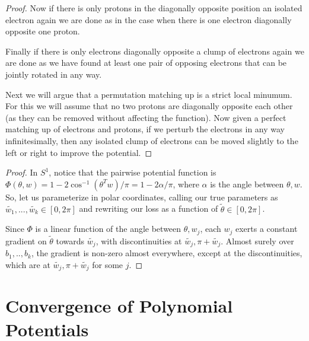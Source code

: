 \documentclass{article}
\begin{document}
\begin{proof}
Now if there is only protons in the diagonally opposite position an isolated electron again we are done as in the case when there is one electron diagonally opposite one proton. 

Finally if there is only electrons diagonally opposite a clump of electrons again we are done as we have found at least one pair of opposing electrons that can be jointly rotated in any way.

Next we will argue that a permutation matching up is a strict local minumum. For this we will assume that no two protons are diagonally opposite each other (as they can be removed without affecting the function). Now given a perfect matching up of electrons and protons, if we perturb the electrons in any way infinitesimally, then any isolated clump of electrons can be moved slightly to  the left or right to improve the potential.
\end{proof}

\signconv*

\begin{proof}
In $S^1$, notice that the pairwise potential function is $\Phi(\theta,w) = 1 - 2\cos^{-1}(\theta^Tw)/\pi = 1 - 2\alpha/\pi$, where $\alpha$ is the angle between $\theta, w$. So, let us parameterize in polar coordinates, calling our true parameters as $\widetilde{w_1},...,\widetilde{w_k} \in [0,2\pi]$ and rewriting our loss as a function of $\widetilde{\theta} \in [0,2\pi]$. 

Since $\Phi$ is a linear function of the angle between $\theta, w_j$, each $w_j$ exerts a constant gradient on $\widetilde{\theta}$ towards $\widetilde{w_j}$, with discontinuities at $\widetilde{w_j},\pi+\widetilde{w_j}$. Almost surely over $b_1,..,b_k$, the gradient is non-zero almost everywhere, except at the discontinuities, which are at $\widetilde{w_j}, \pi+\widetilde{w_j}$ for some $j$. 
\end{proof}

\section{Convergence of Polynomial Potentials}

\polystrict*
\end{document}
